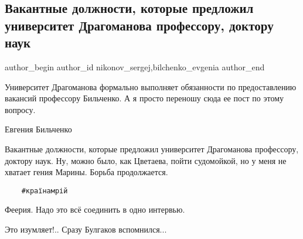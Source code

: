  
 
 
 
 
 
\subsection{Вакантные должности, которые предложил университет Драгоманова профессору, доктору наук}
\label{sec:09_09_2021.fb.nikonov_sergej.1.vacansii_bilchenko}
 
\ifcmt
 author_begin
   author_id nikonov_sergej,bilchenko_evgenia
 author_end
\fi

Университет Драгоманова формально выполняет обязанности по предоставлению
вакансий профессору Бильченко. А я просто переношу сюда ее пост по этому
вопросу. 


Евгения Бильченко

Вакантные должности, которые предложил университет Драгоманова профессору,
доктору наук. Ну, можно было, как Цветаева, пойти судомойкой, но у меня не
хватает гения Марины. Борьба продолжается. 

\begin{verbatim}
	#країнамрій
\end{verbatim}

\begin{itemize}
 
Феерия. Надо это всё соединить в одно интервью.

 
Это изумляет!.. Сразу Булгаков вспомнился...

\end{itemize}

